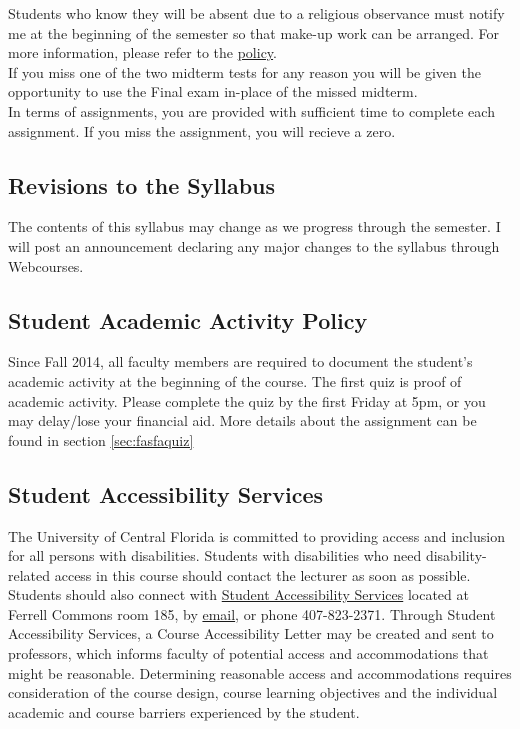 \documentclass[11pt]{paper}
\begin{document}
Students who know they will be absent due to a religious observance must notify me at the beginning of the semester so that make-up work can be arranged. For more information, please refer to the \href{https://regulations.ucf.edu/docs/notices/5.020ReligiousObservancesNEW_Oct09_000.pdf}{policy}.\\

If you miss one of the two midterm tests for any reason you will be given the opportunity to use the Final exam in-place of the missed midterm.\\

In terms of assignments, you are provided with sufficient time to complete each assignment. If you miss the assignment, you will recieve a zero.

\subsection{Revisions to the Syllabus}
The contents of this syllabus may change as we progress through the semester. I will post an announcement declaring any major changes to the syllabus through Webcourses.
\subsection{Student Academic Activity Policy} \label{sec:fasfa}

Since Fall 2014, all faculty members are required to document the student's academic activity at the beginning of the course. The first quiz is proof of academic activity. Please complete the quiz by the first Friday at 5pm, or you may delay/lose your financial aid. More details about the assignment can be found in section \ref{sec:fasfaquiz} 
\subsection{Student Accessibility Services}
The University of Central Florida is committed to providing access and inclusion for all persons with disabilities. Students with disabilities who need disability-related access in this course should contact the lecturer as soon as possible. Students should also connect with \href{https://sas.sdes.ucf.edu}{Student Accessibility Services} located at Ferrell Commons room 185, by \href{mailto:emailsas@ucf.edu}{email}, or phone 407-823-2371. Through Student Accessibility Services, a Course Accessibility Letter may be created and sent to professors, which informs faculty of potential access and accommodations that might be reasonable. Determining reasonable access and accommodations requires consideration of the course design, course learning objectives and the individual academic and course barriers experienced by the student.
\end{document}
